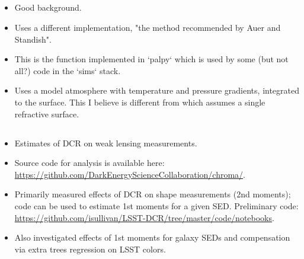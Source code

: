 \documentclass[DM,authoryear,toc]{lsstdoc}
\begin{document}
\subsection{\cite{Hohenkerk1985}}
\begin{itemize}
	\item Good background.
	\item Uses a different implementation, "the method recommended by Auer
	and Standish".
	\item This is the function implemented in `palpy` which is used by
	some (but not all?) code in the `sims` stack.
	\item Uses a model atmosphere with temperature and pressure gradients,
	integrated to the surface.  This I believe is different from \cite{1982PASP...94..715F}
	which assumes a single refractive surface.
\end{itemize}

\subsection{\cite{2015ApJ...807..182M}}

\begin{itemize}
	\item Estimates of DCR on weak lensing measurements.
	\item Source code for analysis is available here:
          \url{https://github.com/DarkEnergyScienceCollaboration/chroma/}.
	\item Primarily measured effects of DCR on shape measurements
          (2nd moments); code can be used to estimate 1st moments for
          a given SED. Preliminary code:
          \url{https://github.com/isullivan/LSST-DCR/tree/master/code/notebooks}.
        \item Also investigated effects of 1st moments for galaxy SEDs
          and compensation via extra trees regression on LSST colors.
\end{itemize}


\subsection{\cite{2005ASPC..338..134C}}
\end{document}
